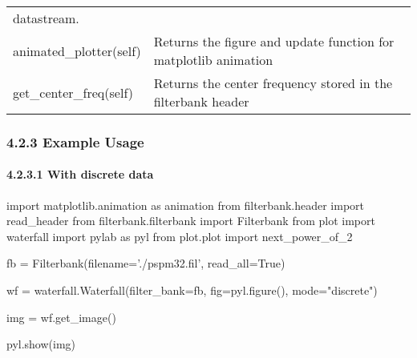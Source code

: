 \documentclass[]{article}
\newenvironment{Shaded}{}{}
\newcommand{\StringTok}[1]{\textcolor[rgb]{0.25,0.44,0.63}{#1}}
\newcommand{\ImportTok}[1]{#1}
\newcommand{\VariableTok}[1]{\textcolor[rgb]{0.10,0.09,0.49}{#1}}
\newcommand{\OperatorTok}[1]{\textcolor[rgb]{0.40,0.40,0.40}{#1}}
\newcommand{\NormalTok}[1]{#1}
\let\oldparagraph\paragraph
\renewcommand{\paragraph}[1]{\oldparagraph{#1}\mbox{}}
\begin{document}
\begin{longtable}[]{@{}ll@{}}
\begin{minipage}[t]{0.67\columnwidth}
datastream.\strut
\end{minipage}\tabularnewline
\begin{minipage}[t]{0.27\columnwidth}\raggedright\strut
animated\_plotter(self)\strut
\end{minipage} & \begin{minipage}[t]{0.67\columnwidth}\raggedright\strut
Returns the figure and update function for matplotlib animation\strut
\end{minipage}\tabularnewline
\begin{minipage}[t]{0.27\columnwidth}\raggedright\strut
get\_center\_freq(self)\strut
\end{minipage} & \begin{minipage}[t]{0.67\columnwidth}\raggedright\strut
Returns the center frequency stored in the filterbank header\strut
\end{minipage}\tabularnewline
\bottomrule
\end{longtable}

\subsubsection{4.2.3 Example Usage}\label{example-usage-4}

\paragraph{4.2.3.1 With discrete data}\label{with-discrete-data}

\begin{Shaded}
\begin{Highlighting}[]
\ImportTok{import}\NormalTok{ matplotlib.animation }\ImportTok{as}\NormalTok{ animation}
\ImportTok{from}\NormalTok{ filterbank.header }\ImportTok{import}\NormalTok{ read_header}
\ImportTok{from}\NormalTok{ filterbank.filterbank }\ImportTok{import}\NormalTok{ Filterbank}
\ImportTok{from}\NormalTok{ plot }\ImportTok{import}\NormalTok{ waterfall}
\ImportTok{import}\NormalTok{ pylab }\ImportTok{as}\NormalTok{ pyl}
\ImportTok{from}\NormalTok{ plot.plot }\ImportTok{import}\NormalTok{ next_power_of_2}

\NormalTok{fb }\OperatorTok{=}\NormalTok{ Filterbank(filename}\OperatorTok{=}\StringTok{'./pspm32.fil'}\NormalTok{, read_all}\OperatorTok{=}\VariableTok{True}\NormalTok{)}

\NormalTok{wf }\OperatorTok{=}\NormalTok{ waterfall.Waterfall(filter_bank}\OperatorTok{=}\NormalTok{fb, fig}\OperatorTok{=}\NormalTok{pyl.figure(), mode}\OperatorTok{=}\StringTok{"discrete"}\NormalTok{)}

\NormalTok{img }\OperatorTok{=}\NormalTok{ wf.get_image()}

\NormalTok{pyl.show(img)}
\end{Highlighting}
\end{Shaded}
\end{document}
